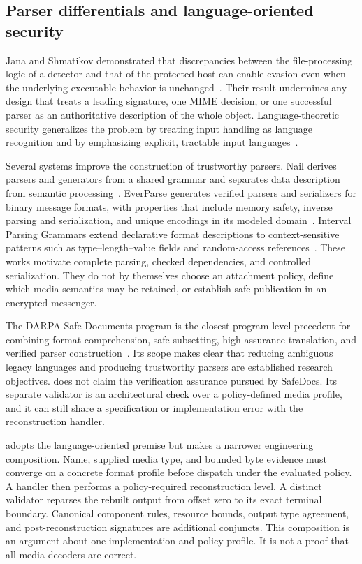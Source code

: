 \subsection{Parser differentials and language-oriented security}

Jana and Shmatikov demonstrated that discrepancies between the file-processing
logic of a detector and that of the protected host can enable evasion even when
the underlying executable behavior is unchanged~\cite{jana2012}. Their result
undermines any design that treats a leading signature, one MIME decision, or
one successful parser as an authoritative description of the whole object.
Language-theoretic security generalizes the problem by treating input handling
as language recognition and by emphasizing explicit, tractable input
languages~\cite{momot2016}.

Several systems improve the construction of trustworthy parsers. Nail derives
parsers and generators from a shared grammar and separates data description
from semantic processing~\cite{nail2014}. EverParse generates verified parsers
and serializers for binary message formats, with properties that include
memory safety, inverse parsing and serialization, and unique encodings in its
modeled domain~\cite{everparse2019}. Interval Parsing Grammars extend
declarative format descriptions to context-sensitive patterns such as
type--length--value fields and random-access references~\cite{ipg2023}. These
works motivate complete parsing, checked dependencies, and controlled
serialization. They do not by themselves choose an attachment policy, define
which media semantics may be retained, or establish safe publication in an
encrypted messenger.

The DARPA Safe Documents program is the closest program-level precedent for
combining format comprehension, safe subsetting, high-assurance translation,
and verified parser construction~\cite{darpaSafeDocs}. Its scope makes clear
that reducing ambiguous legacy languages and producing trustworthy parsers are
established research objectives. \AFD{} does not claim the verification
assurance pursued by SafeDocs. Its separate validator is an architectural
check over a policy-defined media profile, and it can still share a
specification or implementation error with the reconstruction handler.

\AFD{} adopts the language-oriented premise but makes a narrower engineering
composition. Name, supplied media type, and bounded byte evidence must converge
on a concrete format profile before dispatch under the evaluated policy. A
handler then performs a policy-required reconstruction level. A distinct
validator reparses the rebuilt output from offset zero to its exact terminal
boundary. Canonical component rules, resource bounds, output type agreement,
and post-reconstruction signatures are additional conjuncts. This composition
is an argument about one implementation and policy profile. It is not a proof
that all media decoders are correct.

